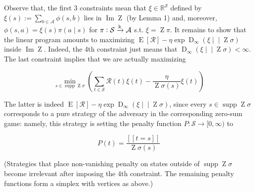 \documentclass[a4paper]{article}
\DeclareMathOperator{\Supp}{supp}
\DeclareMathOperator{\Img}{Im}
\newcommand{\AP}[1]{\left(#1\right)}
\newcommand{\AB}[1]{\left[#1\right]}
\newcommand{\Ea}[2]{\underset{#1}{\operatorname{E}}\AB{#2}}
\newcommand{\RD}[3]{\operatorname{D}_{#1}\AP{#2\middle\vert\middle\vert#3}}
\newcommand{\Reals}{\mathbb{R}}
\newcommand{\K}{\xrightarrow{\textnormal{k}}}
\newcommand{\A}{\mathcal{A}}
\newcommand{\St}{\mathcal{S}}
\newcommand{\R}{\mathcal{R}}
\DeclareMathOperator{\Z}{Z}
\begin{document}
Observe that, the first 3 constraints mean that $\xi\in\Reals^\St$ defined by $\xi(s) := \sum_{b\in\A} \phi(s,b)$ lies in $\Img{\Z}$ (by Lemma 1) and, moreover, $\phi(s,a) = \xi(s)\pi(a \mid s)$ for $\pi:\St\K\A$ s.t. $\xi = \Z\pi$. It remains to show that the linear program amounts to maximizing $\Ea{}{\R} - \eta\exp\RD{\infty}{\xi}{\Z\sigma}$ inside $\Img\Z$. Indeed, the 4th constraint just means that $\RD{\infty}{\xi}{\Z\sigma} < \infty$. The last constraint implies that we are actually maximizing

$$\min_{s\in\Supp\Z\sigma} \AP{\sum_{t\in\St} \R(t)\xi(t) - \frac{\eta}{\Z\sigma(s)} \xi(t)}$$

The latter is indeed $\Ea{}{\R} - \eta\exp\RD{\infty}{\xi}{\Z\sigma}$, since every $s\in\Supp{\Z\sigma}$ corresponds to a pure strategy of the adversary in the corresponding zero-sum game: namely, this strategy is setting the penalty function $P: \St \rightarrow [0,\infty)$ to

$$P(t) = \frac{[[t=s]]}{\Z\sigma(s)}$$

(Strategies that place non-vanishing penalty on states outside of $\Supp{\Z\sigma}$ become irrelevant after imposing the 4th constraint. The remaining penalty functions form a simplex with vertices as above.)
\end{document}
